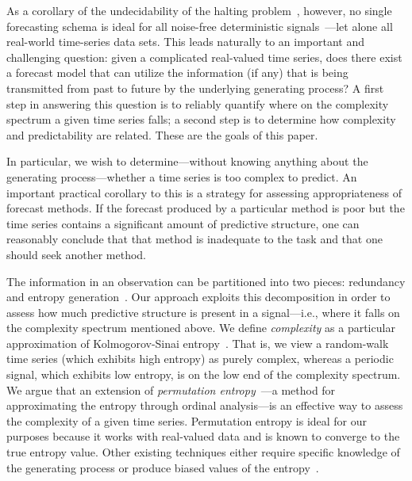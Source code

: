 As a corollary of the undecidability of the halting
problem~\cite{halting-problem}, however, no single forecasting schema
is ideal for all noise-free deterministic
signals~\cite{weigend-book}---let alone all real-world time-series
data sets.  This leads naturally to an important and challenging
question: given a complicated real-valued time series, does there
exist a forecast model that can utilize the information (if any) that
is being transmitted from past to future by the underlying generating
process?  A first step in answering this question is to reliably
quantify where on the complexity spectrum a given time series falls; a
second step is to determine how complexity and predictability are
related.  These are the goals of this paper.

In particular, we wish to determine---without knowing anything about
the generating process---whether a time series is too complex to
predict.  An important practical corollary to this is a strategy for
assessing appropriateness of forecast methods.  If the forecast
produced by a particular method is poor but the time series contains a
significant amount of predictive structure, one can reasonably conclude that that method is inadequate
to the task and that one should seek another method.    

The information in an observation can be partitioned into two pieces:
redundancy and entropy generation~\cite{crutchfield2003}.  
\label{page:redundancy}
Our approach exploits this decomposition in order to assess how much
predictive structure is present in a signal---i.e., where it falls on
the complexity spectrum mentioned above.  We define \emph{complexity}
as a particular approximation of Kolmogorov-Sinai
entropy~\cite{KS-entropy}.  That is, we view a random-walk time series
(which exhibits high entropy) as purely complex, whereas a periodic
signal, which exhibits low entropy, is on the low end of the
complexity spectrum.  We argue that an extension of \emph{permutation
  entropy}~\cite{bandt2002per}---a method for approximating the
entropy through ordinal analysis---is an effective way to assess the
complexity of a given time series.  Permutation entropy is ideal for
our purposes because it works with real-valued data and is known to
converge to the true entropy value. Other existing techniques either
require specific knowledge of the generating process or produce biased
values of the entropy~\cite{bollt2001}.

